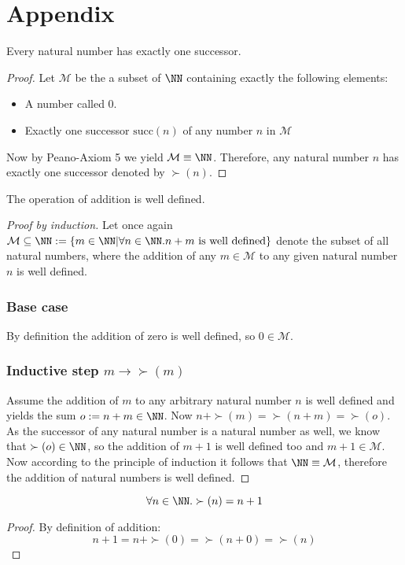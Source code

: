 \section{Appendix}
\begin{lem}
	Every natural number has exactly one successor. 
\end{lem}
\begin{proof}
	Let $\mathcal{M}$ be the a subset of $\NN$ containing exactly the following elements:
	\begin{itemize}
		\item A number called 0.
		\item Exactly one successor $\text{succ}(n)$ of any number $n$ in $\mathcal{M}$
	\end{itemize}
	Now by Peano-Axiom 5 we yield $\mathcal{M}\equiv \NN$. Therefore, any natural number $n$ has exactly one successor denoted by $\succ(n)$. 
\end{proof}
\begin{lem}
	The operation of addition is well defined.
\end{lem}
\begin{proof}[Proof by induction]
	Let once again $\mathcal{M}\subseteq\NN:=\{m\in\NN|\forall n\in \NN.n+m\text{ is well defined}\}$ denote the subset of all natural numbers, where the addition of any $m\in\mathcal{M}$ to any given natural number $n$ is well defined.  
	\subsubsection*{Base case}
	By definition the addition of zero is well defined, so $0\in \mathcal{M}$. 
	\subsubsection*{Inductive step $m\to \succ(m)$}
	Assume the addition of $m$ to any arbitrary natural number $n$ is well defined and yields the sum $o:=n+m\in \NN$.
	Now $n+\succ(m)=\succ(n+m)=\succ(o)$. As the successor of any natural number is a natural number as well, we know that $\succ(o)\in \NN$, so the addition of $m+1$ is well defined too and $m+1\in\mathcal{M}$. Now according to the principle of induction it follows that $\NN\equiv \mathcal{M}$, therefore the addition of natural numbers is well defined. 
\end{proof}
\begin{lem}
	\[\forall n\in\NN.\succ(n)=n+1\]
\end{lem}
\begin{proof}
	By definition of addition:
	\[n+1=n+\succ(0)=\succ(n+0)=\succ(n)\]
\end{proof}
